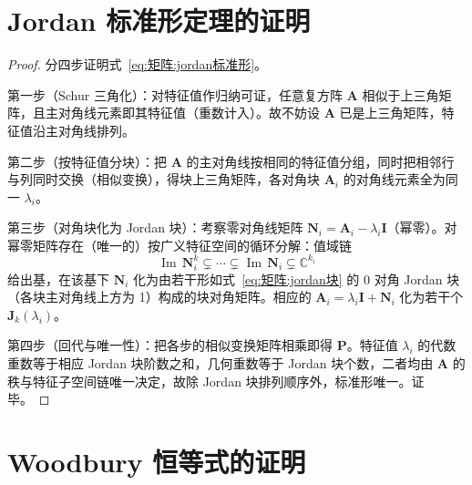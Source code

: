 \section{Jordan 标准形定理的证明}
\label{sec:jordan证明}

\begin{proof}
分四步证明式~\eqref{eq:矩阵:jordan标准形}。

第一步（Schur 三角化）：对特征值作归纳可证，任意复方阵 $\boldsymbol{A}$ 相似于上三角矩阵，且主对角线元素即其特征值（重数计入）。故不妨设 $\boldsymbol{A}$ 已是上三角矩阵，特征值沿主对角线排列。

第二步（按特征值分块）：把 $\boldsymbol{A}$ 的主对角线按相同的特征值分组，同时把相邻行与列同时交换（相似变换），得块上三角矩阵，各对角块 $\boldsymbol{A}_i$ 的对角线元素全为同一 $\lambda_i$。

第三步（对角块化为 Jordan 块）：考察零对角线矩阵 $\boldsymbol{N}_i = \boldsymbol{A}_i-\lambda_i\boldsymbol{I}$（幂零）。对幂零矩阵存在（唯一的）按广义特征空间的循环分解：值域链
\[
\operatorname{Im}\,\boldsymbol{N}_i^{k} \subsetneq \cdots \subsetneq \operatorname{Im}\,\boldsymbol{N}_i \subsetneq \mathbb{C}^{k_i}
\]
给出基，在该基下 $\boldsymbol{N}_i$ 化为由若干形如式~\eqref{eq:矩阵:jordan块} 的 $0$ 对角 Jordan 块（各块主对角线上方为 1）构成的块对角矩阵。相应的 $\boldsymbol{A}_i = \lambda_i\boldsymbol{I}+\boldsymbol{N}_i$ 化为若干个 $\boldsymbol{J}_{k}(\lambda_i)$。

第四步（回代与唯一性）：把各步的相似变换矩阵相乘即得 $\boldsymbol{P}$。特征值 $\lambda_i$ 的代数重数等于相应 Jordan 块阶数之和，几何重数等于 Jordan 块个数，二者均由 $\boldsymbol{A}$ 的秩与特征子空间链唯一决定，故除 Jordan 块排列顺序外，标准形唯一。证毕。
\end{proof}

\section{Woodbury 恒等式的证明}
\label{sec:woodbury证明}

